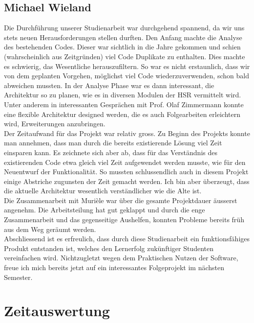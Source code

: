 \documentclass[11pt,a4paper,english,oneside]{book}
\numberwithin{equation}{chapter}
\begin{document}
	\section{Michael Wieland}
	Die Durchführung unserer Studienarbeit war durchgehend spannend, da wir uns stets neuen Herausforderungen stellen durften. Den Anfang machte die Analyse des bestehenden Codes. Dieser war sichtlich in die Jahre gekommen und schien (wahrscheinlich aus Zeitgründen) viel Code Duplikate zu enthalten. Dies machte es schwierig, das Wesentliche herauszufiltern. So war es nicht erstaunlich, dass wir von dem geplanten Vorgehen, möglichst viel Code wiederzuverwenden, schon bald abweichen mussten. In der Analyse Phase war es dann interessant, die Architektur so zu planen, wie es in diversen Modulen der HSR vermittelt wird. Unter anderem in interessanten Gesprächen mit Prof. Olaf Zimmermann konnte eine flexible Architektur designed werden, die es auch Folgearbeiten erleichtern wird, Erweiterungen anzubringen. \\
	
	\noindent
	Der Zeitaufwand für das Projekt war relativ gross. Zu Beginn des Projekts konnte man annehmen, dass man durch die bereits existierende Lösung viel Zeit einsparen kann. Es zeichnete sich aber ab, dass für das Verständnis des existierenden Code etwa gleich viel Zeit aufgewendet werden musste, wie für den Neuentwurf der Funktionalität. So mussten schlussendlich auch in diesem Projekt einige Abstriche zugunsten der Zeit gemacht werden. Ich bin aber überzeugt, dass die aktuelle Architektur wesentlich verständlicher wie die Alte ist. \\
	
	\noindent
	Die Zusammenarbeit mit Murièle war über die gesamte Projektdauer äusserst angenehm. Die Arbeitsteilung hat gut geklappt und durch die enge Zusammenarbeit und das gegenseitige Aushelfen, konnten Probleme bereits früh aus dem Weg geräumt werden. \\
	
	\noindent
	Abschliessend ist es erfreulich, dass durch diese Studienarbeit ein funktionsfähiges Produkt entstanden ist, welches den Lernerfolg zukünftiger Studenten vereinfachen wird. Nichtzugletzt wegen dem Praktischen Nutzen der Software, freue ich mich bereits jetzt auf ein interessantes Folgeprojekt im nächsten Semester.
	
	\chapter{Zeitauswertung}	\label{zeitauswertung}
	
\end{document}
